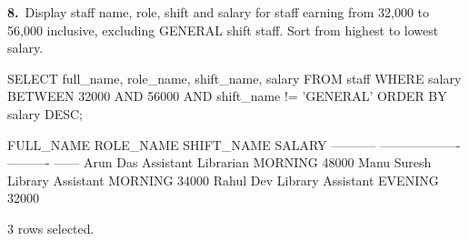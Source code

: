 \noindent\begin{minipage}{\linewidth}
\begingroup{}
{\fontsize{14}{17}\selectfont\textbf{8.}}\ Display staff name, role, shift and salary for staff earning from 32,000 to 56,000 inclusive, excluding GENERAL shift staff. Sort from highest to lowest salary.\par
\endgroup\vspace{12pt}


\begin{sqlcode}
SELECT full_name, role_name, shift_name, salary
FROM staff
WHERE salary BETWEEN 32000 AND 56000
  AND shift_name != 'GENERAL'
ORDER BY salary DESC;
\end{sqlcode}

\vspace{18pt}


\begin{sqlout}[fontsize=\small]
FULL_NAME    ROLE_NAME            SHIFT_NAME  SALARY
-----------  -------------------  ----------  ------
Arun Das     Assistant Librarian  MORNING      48000
Manu Suresh  Library Assistant    MORNING      34000
Rahul Dev    Library Assistant    EVENING      32000

3 rows selected.
\end{sqlout}
\end{minipage}\par\vspace{24pt}

